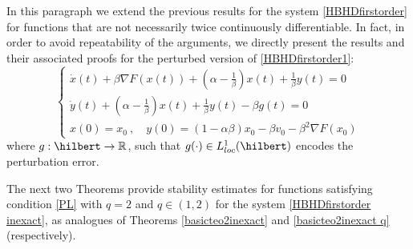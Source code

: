 \documentclass[reqno]{amsart}
\theoremstyle{plain}
\newtheorem{proposition}{Proposition}	%
\theoremstyle{definition}
\theoremstyle{remark}
\newcommand{\R}{\mathbb{R}}	%
\newcommand{\VA}{\VAcomment}
\begin{document}
In this paragraph we extend the previous results for the system \eqref{HBHDfirstorder} for functions that are not necessarily twice continuously differentiable. In fact, in order to avoid repeatability of the arguments, we directly present the results and their associated proofs for the perturbed version of \eqref{HBHDfirstorder1}:
\begin{equation}
	\begin{cases}{}\label{HBHDfirstorder inexact}\tag{g-DIN-p}
		\dot{x}(t) +\beta\nabla F(x(t)) + \left(\alpha-\frac{1}{\beta}\right)x(t) + \frac{1}{\beta}y(t) = 0 \\
		\dot{y}(t) + \left(\alpha-\frac{1}{\beta}\right)x(t) + \frac{1}{\beta}y(t) - \beta g(t) = 0 \\
		x(0)=x_{0} ~ , \quad y(0)= (1-\alpha\beta)x_{0}  -\beta v_{0}- \beta^{2}\nabla F(x_{0})
	\end{cases}
\end{equation}
where $g:\hilbert\to\R$, such that $g(\cdot)\in L^{1}_{loc}(\hilbert)$ encodes the perturbation error. 

The next two Theorems provide stability estimates for functions satisfying condition \ref{PL} with $q=2$ and $q\in(1,2)$ for the system \eqref{HBHDfirstorder inexact}, as analogues  of Theorems \ref{basicteo2inexact} and \ref{basicteo2inexact q} (respectively). 

%			
\end{document}
